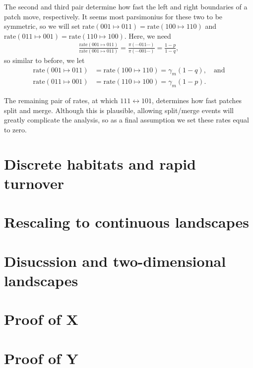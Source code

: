 \documentclass{article}
\newcommand{\rate}[2]{\text{rate}(#1\mapsto#2)}
\begin{document}
The second and third pair determine how fast the left and right boundaries of a patch move, respectively.
It seems most parsimonius for these two to be symmetric,
so we will set $\rate{001}{011} = \rate{100}{110}$ and $\rate{011}{001} = \rate{110}{100}$.
Here, we need
\begin{align*}
    \frac{\rate{001}{011}}{\rate{001}{011}}
    =
    \frac{\pi(\cdots011\cdots)}{\pi(\cdots001\cdots)}
    =
    \frac{1-p}{1-q} ,
\end{align*}
so similar to before, we let
\begin{align}
    \rate{001}{011} &= \rate{100}{110} = \gamma_m (1-q), \quad \text{and} \\
    \rate{011}{001} &= \rate{110}{100} = \gamma_m (1-p) .
\end{align}

The remaining pair of rates, at which $111 \leftrightarrow 101$,
determines how fast patches split and merge.
Although this is plausible, allowing split/merge events will greatly complicate the analysis,
so as a final assumption we set these rates equal to zero.


\section{Discrete habitats and rapid turnover}




\section{Rescaling to continuous landscapes}



\section{Disucssion and two-dimensional landscapes}



\appendix

\section{Proof of X}

\section{Proof of Y}


\nocite{*}

\end{document}

